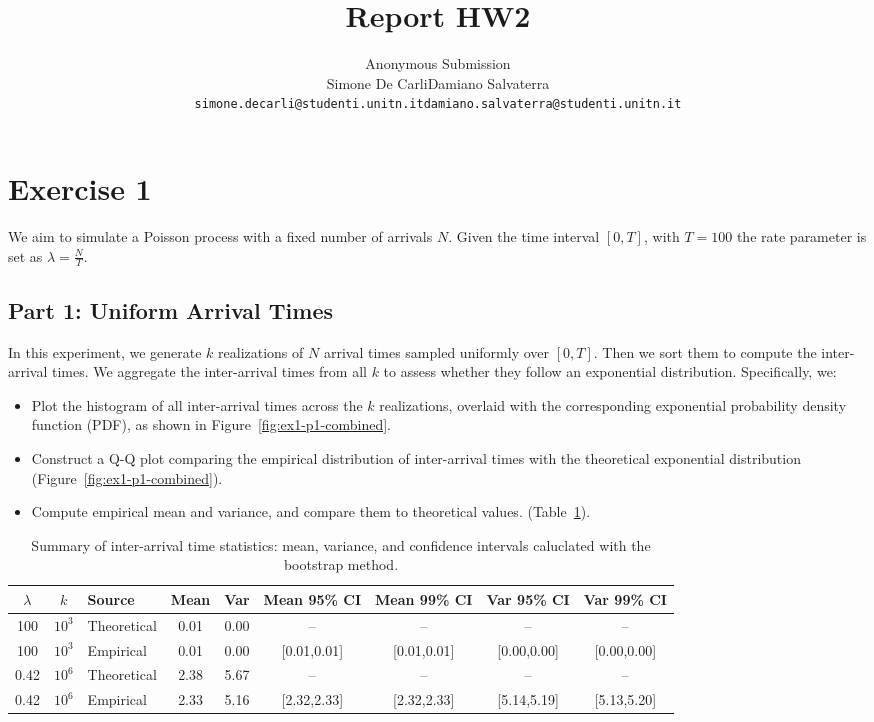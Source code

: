 \documentclass[a4paper]{article}
\title{Report HW2}
\author{%
  \ifdefined\anonymous%
  Anonymous Submission
  \else
  \begin{tabular}{cc}
    Simone De Carli & Damiano Salvaterra \\
    {\small\texttt{simone.decarli@studenti.unitn.it}} &
    {\small\texttt{damiano.salvaterra@studenti.unitn.it}}
  \end{tabular}
  \fi
}
\date{}  %
\begin{document}
\maketitle

\section*{Exercise 1}

We aim to simulate a Poisson process with a fixed number of arrivals
$N$. Given the time interval $[0, T]$, with $T = 100$ the rate
parameter is set as $\lambda = \frac{N}{T}$.

\subsection*{Part 1: Uniform Arrival Times}

In this experiment, we generate $k$ realizations of $N$ arrival times
sampled uniformly over $[0, T]$. Then we sort them to compute the
inter-arrival times.
We aggregate the inter-arrival times from all $k$ to assess whether
they follow an exponential distribution. Specifically, we:

\begin{itemize}
    \setlength\itemsep{0.01em}
  \item Plot the histogram of all inter-arrival times across the $k$
    realizations, overlaid with the corresponding exponential
    probability density function (PDF), as shown in
    Figure~\ref{fig:ex1-p1-combined}.
  \item Construct a Q-Q plot comparing the empirical distribution of
    inter-arrival times with the theoretical exponential distribution
    (Figure~\ref{fig:ex1-p1-combined}).
  \item Compute empirical mean and variance, and compare them to
    theoretical values. (Table~\ref{tab:ex1-p1-ci-summary}).
\end{itemize}

\begin{table}[htbp]
  \centering
  \small
  \begin{tabular}{@{}cc|lcccccc@{}}
    \toprule
    $\lambda$ & $k$ & Source & Mean & Var & Mean 95\% CI & Mean 99\%
    CI & Var 95\% CI & Var 99\% CI \\
    \midrule
    100 & $10^3$ & Theoretical & 0.01 & 0.00 & -- & -- & -- & -- \\
    100 & $10^3$ & Empirical   & 0.01 & 0.00 & [0.01,0.01] &
    [0.01,0.01] & [0.00,0.00] & [0.00,0.00] \\
    \midrule
    0.42 & $10^6$ & Theoretical & 2.38 & 5.67 & -- & -- & -- & -- \\
    0.42 & $10^6$ & Empirical   & 2.33 & 5.16 & [2.32,2.33] &
    [2.32,2.33] & [5.14,5.19] & [5.13,5.20] \\
    \bottomrule
  \end{tabular}
  \caption{Summary of inter-arrival time statistics: mean, variance, and
  confidence intervals caluclated with the bootstrap method.}\label{tab:ex1-p1-ci-summary}
\end{table}
\end{document}
